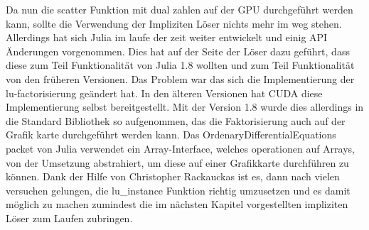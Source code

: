 Da nun die scatter Funktion mit dual zahlen auf der GPU durchgeführt werden kann, 
sollte die Verwendung der Impliziten Löser nichts mehr im weg stehen.
Allerdings hat sich Julia im laufe der zeit weiter entwickelt und einig API Änderungen vorgenommen.
Dies hat auf der Seite der Löser dazu geführt, dass diese zum Teil Funktionalität von Julia 1.8 wollten und zum Teil Funktionalität von den früheren Versionen.
Das Problem war das sich die Implementierung der lu-factorisierung geändert hat.
In den älteren Versionen hat CUDA diese Implementierung selbst bereitgestellt.
Mit der Version 1.8 wurde dies allerdings in die Standard Bibliothek so aufgenommen, das die Faktorisierung 
auch auf der Grafik karte durchgeführt werden kann.
Das OrdenaryDifferentialEquations packet von Julia verwendet 
ein Array-Interface, welches operationen auf Arrays, 
von der Umsetzung abstrahiert, um diese auf einer Grafikkarte durchführen zu können.
Dank der Hilfe von Christopher Rackauckas ist es, dann nach vielen versuchen gelungen, die lu\_instance Funktion richtig umzusetzen 
und es damit möglich zu machen zumindest die im nächsten Kapitel vorgestellten impliziten Löser zum Laufen zubringen.












